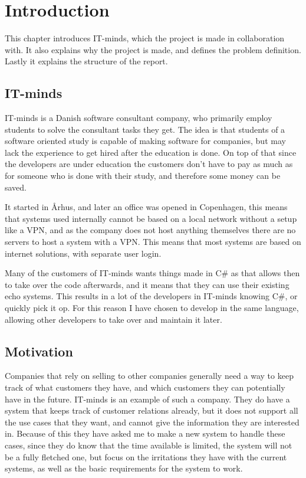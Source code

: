 \chapter{Introduction}
\label{chap:Introduction}
This chapter introduces IT-minds, which the project is made in collaboration with. It also explains why the project is made, and defines the problem definition. Lastly it explains the structure of the report.

\section{IT-minds}
\label{sec:IT-minds}
IT-minds is a Danish software consultant company\cite{IT-minds}, who primarily employ students to solve the consultant tasks they get. The idea is that students of a software oriented study is capable of making software for companies, but may lack the experience to get hired after the education is done. On top of that since the developers are under education the customers don't have to pay as much as for someone who is done with their study, and therefore some money can be saved.

It started in Århus, and later an office was opened in Copenhagen, this means that systems used internally cannot be based on a local network without a setup like a VPN, and as the company does not host anything themselves there are no servers to host a system with a VPN. This means that most systems are based on internet solutions, with separate user login.

Many of the customers of IT-minds wants things made in C\# as that allows then to take over the code afterwards, and it means that they can use their existing echo systems. This results in a lot of the developers in IT-minds knowing C\#, or quickly pick it op. For this reason I have chosen to develop in the same language, allowing other developers to take over and maintain it later.

\section{Motivation}
\label{sec:Motivation}
Companies that rely on selling to other companies generally need a way to keep track of what customers they have, and which customers they can potentially have in the future. IT-minds is an example of such a company. They do have a system that keeps track of customer relations already, but it does not support all the use cases that they want, and cannot give the information they are interested in. Because of this they have asked me to make a new system to handle these cases, since they do know that the time available is limited, the system will not be a fully fletched one, but focus on the irritations they have with the current systems, as well as the basic requirements for the system to work.

